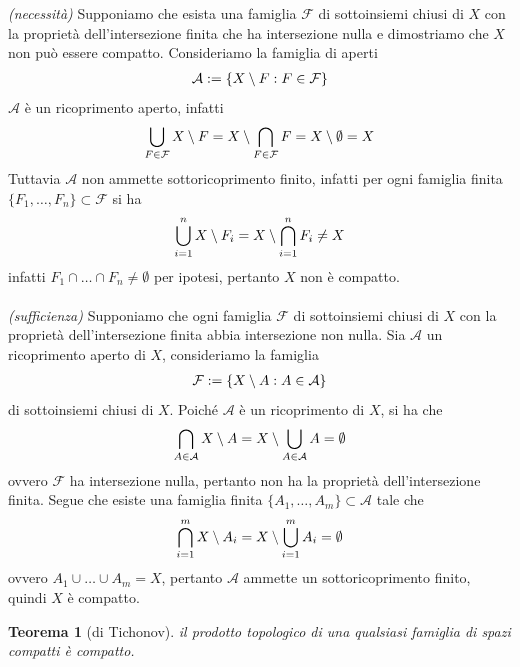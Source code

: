 \documentclass[oneside, 11pt]{amsbook}
\makeatletter
\newcommand{\0}{{(0)}}
\newcommand{\3}{{(3)}}
\theoremstyle{colonplain}
\newtheorem{thm}{Teorema}[chapter]
\theoremstyle{colondefinition}
\theoremstyle{colonremark}
\numberwithin{equation}{chapter}
\renewcommand{\proofname}{Dimostrazione}
\renewenvironment{proof}[1][\proofname]{\par
  \pushQED{\qed}%
  \normalfont \topsep6\p@\@plus6\p@\relax
  \trivlist
  \item[\hskip\labelsep\bfseries #1:]\ignorespaces
}{%
  \popQED\endtrivlist\@endpefalse
}
\makeatother
\begin{document}
\begin{proof}
\textit{(necessità)} Supponiamo che esista una famiglia $\mathcal{F}$ di sottoinsiemi chiusi di $X$ con la proprietà dell'intersezione finita che ha intersezione nulla e dimostriamo che $X$ non può essere compatto. Consideriamo la famiglia di aperti
\begin{align}
    \mathcal{A} := \{ X \setminus F : F \in \mathcal{F} \} \notag
\end{align}
$\mathcal{A}$ è un ricoprimento aperto, infatti
\begin{align}
    \bigcup_{F \in \mathcal{F}} X \setminus F = X \setminus \bigcap_{F \in \mathcal{F}} F = X \setminus \emptyset = X \notag
\end{align}
Tuttavia $\mathcal{A}$ non ammette sottoricoprimento finito, infatti per ogni famiglia finita $\{ F_1, \dots, F_n \} \subset \mathcal{F}$ si ha
\begin{align}
    \bigcup_{i = 1}^n X \setminus F_i = X \setminus \bigcap_{i = 1}^n F_i \neq X \notag 
\end{align}
infatti $F_1 \cap \dots \cap F_n \neq \emptyset$ per ipotesi, pertanto $X$ non è compatto. \\ \\
\textit{(sufficienza)} Supponiamo che ogni famiglia $\mathcal{F}$ di sottoinsiemi chiusi di $X$ con la proprietà dell'intersezione finita abbia intersezione non nulla. Sia $\mathcal{A}$ un ricoprimento aperto di $X$, consideriamo la famiglia
\begin{align}
    \mathcal{F} := \{ X \setminus A : A \in \mathcal{A} \} \notag
\end{align}
di sottoinsiemi chiusi di $X$. Poiché $\mathcal{A}$ è un ricoprimento di $X$, si ha che
\begin{align}
    \bigcap_{A \in \mathcal{A}} X \setminus A = X \setminus \bigcup_{A \in \mathcal{A}} A = \emptyset \notag
\end{align}
ovvero $\mathcal{F}$ ha intersezione nulla, pertanto non ha la proprietà dell'intersezione finita. Segue che esiste una famiglia finita $\{ A_1, \dots, A_m \} \subset \mathcal{A}$ tale che
\begin{align}
    \bigcap_{i = 1}^m X \setminus A_i = X \setminus \bigcup_{i = 1}^m A_i = \emptyset \notag
\end{align}
ovvero $A_1 \cup \dots \cup A_m = X$, pertanto $\mathcal{A}$ ammette un sottoricoprimento finito, quindi $X$ è compatto.
\end{proof}
\begin{thm}[di Tichonov]\label{Tichonov}
il prodotto topologico di una qualsiasi famiglia di spazi compatti è compatto.
\end{thm}
\end{document}
